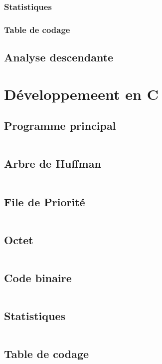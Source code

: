 \documentclass[12pt,a4paper]{article}
\begin{document}
\subsubsection{Statistiques}

\subsubsection{Table de codage}
%
\subsection{Analyse descendante}
%

\section{Développemeent en C}
\subsection{Programme principal}
    \inputminted[breaklines]{c}{../code/src/main.c}
\subsection{Arbre de Huffman}
    \inputminted[breaklines]{c}{../code/src/arbre.c}
\subsection{File de Priorité}
    \inputminted[breaklines]{c}{../code/src/fileDePriorite.c}
\subsection{Octet}
    \inputminted[breaklines]{c}{../code/src/octet.c}
\subsection{Code binaire}
    \inputminted[breaklines]{c}{../code/src/codeBinaire.c}
\subsection{Statistiques}
    \inputminted[breaklines]{c}{../code/src/stats.c}
\subsection{Table de codage}
    \inputminted[breaklines]{c}{../code/src/table.c}
\end{document}
